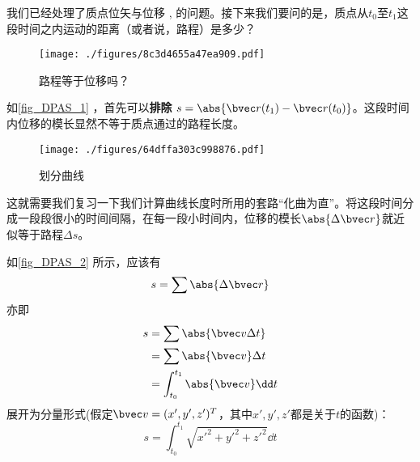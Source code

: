 
我们已经处理了质点位矢与位移 , 的问题。接下来我们要问的是，质点从$t_0$至$t_1$这段时间之内运动的距离（或者说，路程）是多少？

\begin{figure}[ht]
\centering
\texttt{[image: ./figures/8c3d4655a47ea909.pdf]}
\caption{路程等于位移吗？} \label{fig_DPAS_1}
\end{figure}

如\autoref{fig_DPAS_1} ，首先可以\textbf{排除} $s = \abs{\bvec r(t_1) - \bvec r(t_0)}  $。这段时间内位移的模长显然不等于质点通过的路程长度。

\begin{figure}[ht]
\centering
\texttt{[image: ./figures/64dffa303c998876.pdf]}
\caption{划分曲线} \label{fig_DPAS_2}
\end{figure}

这就需要我们复习一下我们计算曲线长度时所用的套路“化曲为直”。将这段时间分成一段段很小的时间间隔，在每一段小时间内，位移的模长$\abs{\Delta \bvec r}$就近似等于路程$\Delta s$。

如\autoref{fig_DPAS_2} 所示，应该有 $$s=\sum \abs{\Delta \bvec r}$$
亦即$$
\begin{aligned}
s&=\sum \abs{\bvec v \Delta t}\\
&=\sum \abs{\bvec v} \Delta t\\
&=\int _{t_0}^{t_1} \abs{\bvec v} \dd t\\
\end{aligned}
$$
展开为分量形式(假定$\bvec v = (x',y',z')^T$，其中$x',y',z'$都是关于$t$的函数)：
$$
s = \int _{t_0}^{t_1} \sqrt{x'^2+y'^2+z'^2} \dd t
$$
